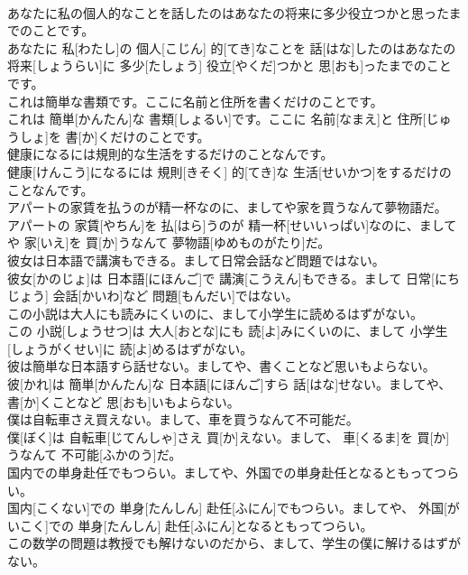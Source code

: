 \documentclass[8pt]{extreport}
\begin{document}
\begin{CJK}{UTF8}{min}
\\	あなたに私の個人的なことを話したのはあなたの将来に多少役立つかと思ったまでのことです。	
\\	あなたに 私[わたし]の 個人[こじん] 的[てき]なことを 話[はな]したのはあなたの 将来[しょうらい]に 多少[たしょう] 役立[やくだ]つかと 思[おも]ったまでのことです。
\\	これは簡単な書類です。ここに名前と住所を書くだけのことです。	
\\	これは 簡単[かんたん]な 書類[しょるい]です。ここに 名前[なまえ]と 住所[じゅうしょ]を 書[か]くだけのことです。
\\	健康になるには規則的な生活をするだけのことなんです。	
\\	健康[けんこう]になるには 規則[きそく] 的[てき]な 生活[せいかつ]をするだけのことなんです。
\\	アパートの家賃を払うのが精一杯なのに、ましてや家を買うなんて夢物語だ。	
\\	アパートの 家賃[やちん]を 払[はら]うのが 精一杯[せいいっぱい]なのに、ましてや 家[いえ]を 買[か]うなんて 夢物語[ゆめものがたり]だ。
\\	彼女は日本語で講演もできる。まして日常会話など問題ではない。	
\\	彼女[かのじょ]は 日本語[にほんご]で 講演[こうえん]もできる。まして 日常[にちじょう] 会話[かいわ]など 問題[もんだい]ではない。
\\	この小説は大人にも読みにくいのに、まして小学生に読めるはずがない。	
\\	この 小説[しょうせつ]は 大人[おとな]にも 読[よ]みにくいのに、まして 小学生[しょうがくせい]に 読[よ]めるはずがない。
\\	彼は簡単な日本語すら話せない。ましてや、書くことなど思いもよらない。	
\\	彼[かれ]は 簡単[かんたん]な 日本語[にほんご]すら 話[はな]せない。ましてや、 書[か]くことなど 思[おも]いもよらない。
\\	僕は自転車さえ買えない。まして、車を買うなんて不可能だ。	
\\	僕[ぼく]は 自転車[じてんしゃ]さえ 買[か]えない。まして、 車[くるま]を 買[か]うなんて 不可能[ふかのう]だ。
\\	国内での単身赴任でもつらい。ましてや、外国での単身赴任となるともってつらい。	
\\	国内[こくない]での 単身[たんしん] 赴任[ふにん]でもつらい。ましてや、 外国[がいこく]での 単身[たんしん] 赴任[ふにん]となるともってつらい。
\\	この数学の問題は教授でも解けないのだから、まして、学生の僕に解けるはずがない。	

\end{CJK}
\end{document}

